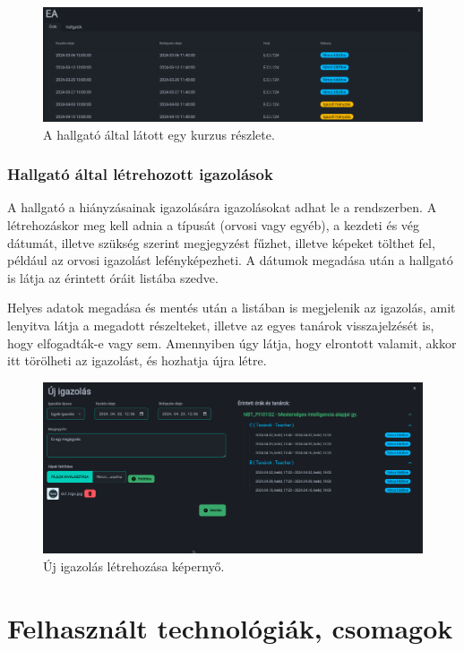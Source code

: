 \documentclass[
]{thesis-ekf}
\theoremstyle{definition}
\theoremstyle{remark}
\begin{document}
\begin{figure}[ht!]
	\centering
	\includegraphics[width=12cm]{../pictures/screenshots/student_course.png}
	\caption{A hallgató által látott egy kurzus részlete.}
	\label{studentCourse}
\end{figure}

\subsection{Hallgató által létrehozott igazolások}

A hallgató a hiányzásainak igazolására igazolásokat adhat le a rendszerben. A létrehozáskor meg kell adnia a típusát (orvosi vagy egyéb), a kezdeti és vég dátumát, illetve szükség szerint megjegyzést fűzhet, illetve képeket tölthet fel, például az orvosi igazolást lefényképezheti. A dátumok megadása után a hallgató is látja az érintett óráit listába szedve.

Helyes adatok megadása és mentés után a listában is megjelenik az igazolás, amit lenyitva látja a megadott részelteket, illetve az egyes tanárok visszajelzését is, hogy elfogadták-e vagy sem. Amennyiben úgy látja, hogy elrontott valamit, akkor itt törölheti az igazolást, és hozhatja újra létre.

\begin{figure}[ht!]
	\centering
	\includegraphics[width=12cm]{../pictures/screenshots/newJust.png}
	\caption{Új igazolás létrehozása képernyő.}
	\label{studentJustification}
\end{figure}

\chapter{Felhasznált technológiák, csomagok}
\label{packages}
\end{document}
